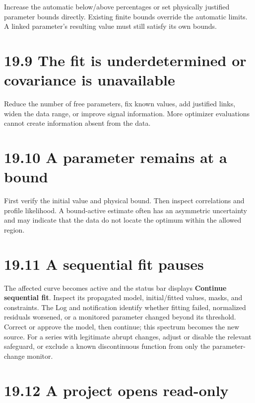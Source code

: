 \documentclass[
  10pt,
  a4paper,
  oneside]{scrreprt}
\begin{document}
Increase the automatic below/above percentages or set physically
justified parameter bounds directly. Existing finite bounds override the
automatic limits. A linked parameter's resulting value must still
satisfy its own bounds.

\hypertarget{the-fit-is-underdetermined-or-covariance-is-unavailable}{%
\section{19.9 The fit is underdetermined or covariance is
unavailable}\label{the-fit-is-underdetermined-or-covariance-is-unavailable}}

Reduce the number of free parameters, fix known values, add justified
links, widen the data range, or improve signal information. More
optimizer evaluations cannot create information absent from the data.

\hypertarget{a-parameter-remains-at-a-bound}{%
\section{19.10 A parameter remains at a
bound}\label{a-parameter-remains-at-a-bound}}

First verify the initial value and physical bound. Then inspect
correlations and profile likelihood. A bound-active estimate often has
an asymmetric uncertainty and may indicate that the data do not locate
the optimum within the allowed region.

\hypertarget{a-sequential-fit-pauses}{%
\section{19.11 A sequential fit pauses}\label{a-sequential-fit-pauses}}

The affected curve becomes active and the status bar displays
\textbf{Continue sequential fit}. Inspect its propagated model,
initial/fitted values, masks, and constraints. The Log and notification
identify whether fitting failed, normalized residuals worsened, or a
monitored parameter changed beyond its threshold. Correct or approve the
model, then continue; this spectrum becomes the new source. For a series
with legitimate abrupt changes, adjust or disable the relevant
safeguard, or exclude a known discontinuous function from only the
parameter-change monitor.

\hypertarget{a-project-opens-read-only}{%
\section{19.12 A project opens
read-only}\label{a-project-opens-read-only}}
\end{document}
